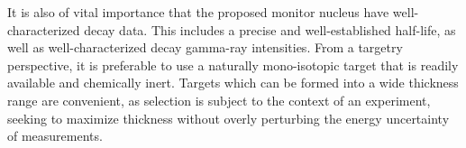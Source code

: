It is also of vital importance that the proposed monitor nucleus have well-characterized decay data.
This includes a precise and well-established half-life,  
as well as well-characterized decay gamma-ray intensities.
From a targetry  perspective, it is preferable to use a naturally mono-isotopic target that is readily available
and  chemically inert.
Targets which can be formed into a wide thickness range are convenient, as selection is subject to the context of an experiment, seeking to maximize thickness without overly perturbing the energy uncertainty of  measurements.
